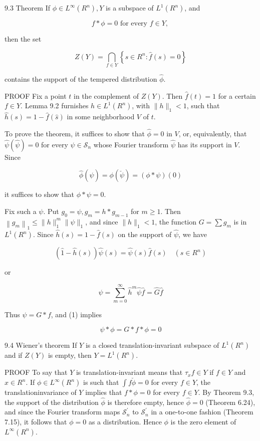 \documentclass[10pt]{article}
\begin{document}
9.3 Theorem If $\phi \in L^{\infty}\left(R^{n}\right), Y$ is a subspace of $L^{1}\left(R^{n}\right)$, and

$$
f * \phi=0 \text { for every } f \in Y \text {, }
$$

then the set

$$
Z(Y)=\bigcap_{f \in Y}\left\{s \in R^{n}: \hat{f}(s)=0\right\}
$$

contains the support of the tempered distribution $\hat{\phi}$.

PROOF Fix a point $t$ in the complement of $Z(Y)$. Then $\hat{f}(t)=1$ for a certain $f \in Y$. Lemma 9.2 furnishes $h \in L^{1}\left(R^{n}\right)$, with $\|h\|_{1}<1$, such that $\hat{h}(s)=1-\hat{f}(\hat{s})$ in some neighborhood $V$ of $t$.

To prove the theorem, it suffices to show that $\hat{\phi}=0$ in $V$, or, equivalently, that $\hat{\psi}(\hat{\psi})=0$ for every $\psi \in \mathscr{S}_{n}$ whose Fourier transform $\hat{\psi}$ has its support in $V$. Since

$$
\hat{\phi}(\hat{\psi})=\phi(\check{\psi})=(\phi * \psi)(0)
$$

it suffices to show that $\phi * \psi=0$.

Fix such a $\psi$. Put $g_{0}=\psi, g_{m}=h * g_{m-1}$ for $m \geq 1$. Then $\left\|g_{m}\right\|_{1} \leq\|h\|_{1}^{m}\|\psi\|_{1}$, and since $\|h\|_{1}<1$, the function $G=\sum g_{m}$ is in $L^{1}\left(R^{n}\right)$. Since $\hat{h}(s)=1-\hat{f}(s)$ on the support of $\hat{\psi}$, we have

$$
(\hat{1}-\hat{h}(s)) \hat{\psi}(s)=\hat{\psi}(s) \hat{f}(s) \quad\left(s \in R^{n}\right)
$$

or

$$
\hat{\psi}=\sum_{m=0}^{\infty} \hat{h}^{m} \hat{\psi} \hat{f}=\hat{G} \hat{f}
$$

Thus $\psi=G * f$, and (1) implies

$$
\psi * \phi=G * f * \phi=0
$$

9.4 Wiener's theorem If $Y$ is a closed translation-invariant subspace of $L^{1}\left(R^{n}\right)$ and if $Z(Y)$ is empty, then $Y=L^{1}\left(R^{n}\right)$.

PROOF To say that $Y$ is translation-invariant means that $\tau_{x} f \in Y$ if $f \in Y$ and $x \in R^{n}$. If $\phi \in L^{\infty}\left(R^{n}\right)$ is such that $\int f \check{\phi}=0$ for every $f \in Y$, the translationinvariance of $Y$ implies that $f * \phi=0$ for every $f \in Y$. By Theorem 9.3, the support of the distribution $\hat{\phi}$ is therefore empty, hence $\hat{\phi}=0$ (Theorem 6.24), and since the Fourier transform maps $\mathscr{S}_{n}^{\prime}$ to $\mathscr{S}_{n}^{\prime}$ in a one-to-one fashion (Theorem 7.15), it follows that $\phi=0$ as a distribution. Hence $\phi$ is the zero element of $L^{\infty}\left(R^{n}\right)$.
\end{document}
